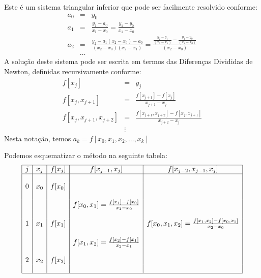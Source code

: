 \documentclass[main.tex]{subfiles}
\begin{document}
Este é um sistema triangular inferior que pode ser facilmente resolvido conforme:
\begin{eqnarray*}
a_0&=&y_0\\
a_1&=&\frac{y_1-a_0}{x_1-x_0}=\frac{y_1-y_0}{x_1-x_0}\\
a_2&=&\frac{y_2-a_1(x_2-x_0)-a_0}{(x_2-x_0)(x_2-x_1)}=\frac{\frac{y_2-y_1}{(x_2-x_1)}-\frac{y_1-y_0}{(x_1-x_0)}}{(x_2-x_0)}\\
&\ldots&
\end{eqnarray*}
A solução deste sistema pode ser escrita em termos das Diferenças Divididas de Newton, definidas recursivamente conforme:
\begin{eqnarray*}
f[x_j]&=&y_j\\
f[x_j,x_{j+1}]&=&\frac{f[x_{j+1}]-f[x_j]}{x_{j+1}-x_j}\\
f[x_j,x_{j+1},x_{j+2}]&=&\frac{f[x_{j+1},x_{j+2}]-f[x_j,x_{j+1}]}{x_{j+2}-x_j}\\
&\vdots&
\end{eqnarray*}
Nesta notação, temos
$a_k=f[x_0,x_1,x_2,\ldots,x_k]$

Podemos esquematizar o método na seguinte tabela:
$$
\begin{array}{|c|c|c|c|c|}\hline
 j&x_j&f[x_j]&f[x_{j-1},x_j]&f[x_{j-2},x_{j-1},x_j]\\\hline
&&&&\\
0& x_0 & f[x_0]&&\\
&&&&\\
&&&f[x_0,x_1]=\frac{f[x_1]-f[x_0]}{x_1-x_0}&\\
&&&&\\
1&x_1&f[x_1]&&f[x_0,x_1,x_2]=\frac{f[x_1,x_2]-f[x_0,x_1]}{x_2-x_0}\\
&&&&\\
&&&f[x_1,x_2]=\frac{f[x_2]-f[x_1]}{x_2-x_1}&\\
&&&&\\
2&x_2&f[x_2]&&\\
&&&&\\ \hline
\end{array}
$$
\end{document}
